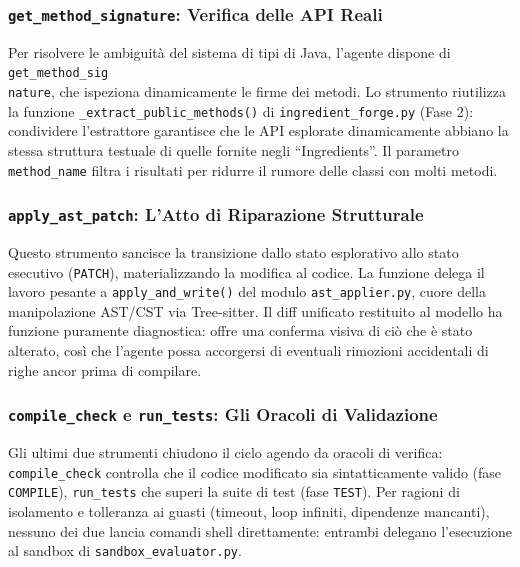 \subsubsection{\texttt{get\_method\_signature}: Verifica delle API Reali}
\label{subsubsec:3.4.4.3}
Per risolvere le ambiguità del sistema di tipi di Java, l'agente dispone di \texttt{get\_method\_sig\\nature}, che
ispeziona dinamicamente le firme dei metodi. Lo strumento riutilizza la funzione \texttt{\_extract\_public\_methods()} di \texttt{ingredient\_forge.py} (Fase 2):
condividere l'estrattore garantisce che le API esplorate dinamicamente abbiano la stessa struttura testuale di
quelle fornite negli ``Ingredients''. Il parametro \texttt{method\_name} filtra i risultati per ridurre il rumore
delle classi con molti metodi.

\subsubsection{\texttt{apply\_ast\_patch}: L'Atto di Riparazione Strutturale}
\label{subsubsec:3.4.4.4}
Questo strumento sancisce la transizione dallo stato esplorativo allo stato
esecutivo (\texttt{PATCH}), materializzando la modifica al codice. La funzione delega il lavoro pesante a \texttt{apply\_and\_write()} del modulo \texttt{ast\_applier.py}, cuore della
manipolazione AST/CST via Tree-sitter. Il diff unificato restituito al modello ha funzione puramente diagnostica:
offre una conferma visiva di ciò che è stato alterato, così che l'agente possa accorgersi di eventuali rimozioni
accidentali di righe ancor prima di compilare.

\subsubsection{\texttt{compile\_check} e \texttt{run\_tests}: Gli Oracoli di Validazione}
\label{subsubsec:3.4.4.5}
Gli ultimi due strumenti chiudono il ciclo agendo da oracoli di verifica: \texttt{compile\_check} controlla che il
codice modificato sia sintatticamente valido (fase \texttt{COMPILE}), \texttt{run\_tests} che superi la suite di test
(fase \texttt{TEST}). Per ragioni di isolamento e tolleranza ai guasti (timeout, loop infiniti, dipendenze mancanti),
nessuno dei due lancia comandi shell direttamente: entrambi delegano l'esecuzione al sandbox di
\texttt{sandbox\_evaluator.py}.


